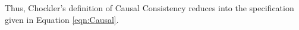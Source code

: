 \documentclass[journal,compsoc]{IEEEtran}
\begin{document}
 Thus, Chockler's definition of Causal Consistency reduces into the specification given in Equation \ref{eqn:Causal}. 
\end{document}
